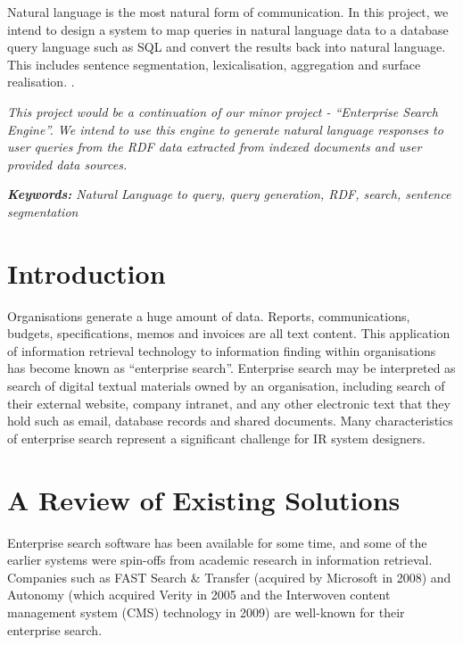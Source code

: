 \documentclass[a4paper,12pt,oneside]{book}
\begin{document}
Natural language is the most natural form of communication. In this project, we intend to design a system to map queries in natural language data to a database query language such as SQL and convert the results back into natural language. This includes sentence segmentation, lexicalisation, aggregation and surface realisation. \blindtext.

\textit{This project would be a continuation of our minor project - “Enterprise Search Engine”. We intend to use this engine to generate natural language responses to user queries from the RDF data extracted from indexed documents and user provided data sources.}

\textit{\textbf{Keywords:} Natural Language to query, query generation, RDF, search, sentence segmentation}


\tableofcontents

\listoffigures

\mainmatter

\pagestyle{plain}

\chapter{Introduction}

Organisations generate a huge amount of data. Reports, communications, budgets, specifications, memos and invoices are all text content. This application of information retrieval technology to information finding within organisations has become known as “enterprise search”. Enterprise search may be interpreted as search of digital textual materials owned by an organisation, including search of their external website, company intranet, and any other electronic text that they hold such as email, database records and shared documents. Many characteristics of enterprise search represent a significant challenge for IR system designers.

\blindtext

\lipsum[4]

\chapter{A Review of Existing Solutions}
Enterprise search software has been available for some time, and some of the earlier systems were spin-offs from academic research in information retrieval. Companies such as FAST Search \& Transfer (acquired by Microsoft in 2008) and Autonomy (which acquired Verity in 2005 and the Interwoven content management system (CMS) technology in 2009) are well-known for their enterprise search. 
\end{document}
